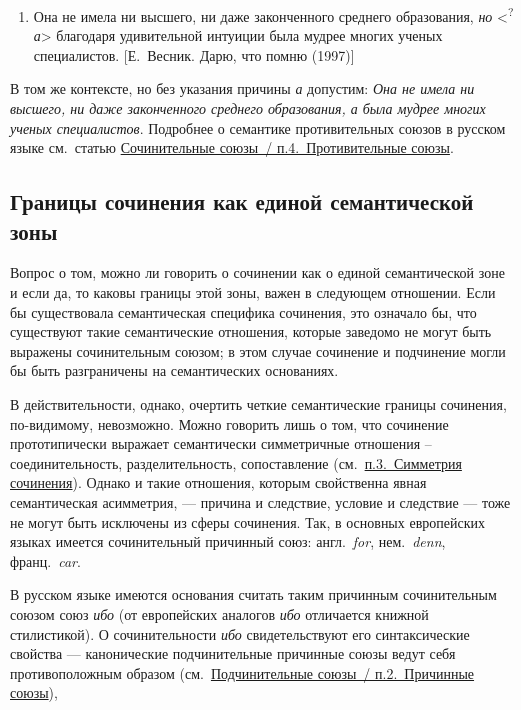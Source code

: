 \begin{enumerate}
\def\labelenumi{(\arabic{enumi})}
\setcounter{enumi}{175}
\item
  Она не имела ни высшего, ни даже законченного среднего образования,
  \textit{но} \textless{}\textsuperscript{?}\textit{а}\textgreater{}
  благодаря удивительной интуиции была мудрее многих ученых
  специалистов. {[}Е.~Весник. Дарю, что помню (1997){]}
\end{enumerate}

В том же контексте, но без указания причины \textit{а} допустим: \textit{Она
не имела ни высшего, ни даже законченного среднего образования, а была
мудрее многих ученых специалистов}. Подробнее о семантике противительных
союзов в русском языке см.~статью \underline{Сочинительные союзы~/
п.4.~Противительные союзы}.

\subsection{Границы сочинения как единой семантической
зоны}\label{ux433ux440ux430ux43dux438ux446ux44b-ux441ux43eux447ux438ux43dux435ux43dux438ux44f-ux43aux430ux43a-ux435ux434ux438ux43dux43eux439-ux441ux435ux43cux430ux43dux442ux438ux447ux435ux441ux43aux43eux439-ux437ux43eux43dux44b}

Вопрос о том, можно ли говорить о сочинении как о единой семантической
зоне и если да, то каковы границы этой зоны, важен в следующем
отношении. Если бы существовала семантическая специфика сочинения, это
означало бы, что существуют такие семантические отношения, которые
заведомо не могут быть выражены сочинительным союзом; в этом случае
сочинение и подчинение могли бы быть разграничены на семантических
основаниях.

В действительности, однако, очертить четкие семантические границы
сочинения, по-видимому, невозможно. Можно говорить лишь о том, что
сочинение прототипически выражает семантически симметричные отношения --
соединительность, разделительность, сопоставление
(см.~\underline{п.3.~Симметрия сочинения}). Однако и такие отношения,
которым свойственна явная семантическая асимметрия, --- причина и
следствие, условие и следствие --- тоже не могут быть исключены из сферы
сочинения. Так, в основных европейских языках имеется сочинительный
причинный союз: англ.~\textit{for}, нем.~\textit{denn}, франц.~\textit{car}.

В русском языке имеются основания считать таким причинным сочинительным
союзом союз \textit{ибо} (от европейских аналогов \textit{ибо} отличается
книжной стилистикой). О сочинительности \textit{ибо} свидетельствуют его
синтаксические свойства --- канонические подчинительные причинные союзы
ведут себя противоположным образом (см.~\underline{Подчинительные
союзы~/ п.2.~Причинные союзы}),

